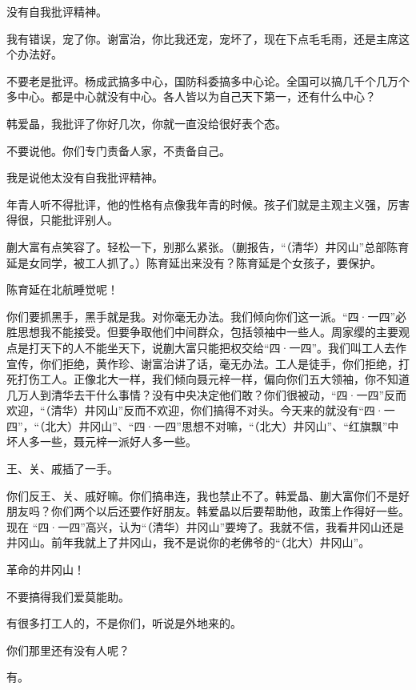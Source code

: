 没有自我批评精神。

我有错误，宠了你。谢富治，你比我还宠，宠坏了，现在下点毛毛雨，还是主席这个办法好。

不要老是批评。杨成武搞多中心，国防科委搞多中心论。全国可以搞几千个几万个多中心。都是中心就没有中心。各人皆以为自己天下第一，还有什么中心？

韩爱晶，我批评了你好几次，你就一直没给很好表个态。

不要说他。你们专门责备人家，不责备自己。

我是说他太没有自我批评精神。

年青人听不得批评，他的性格有点像我年青的时候。孩子们就是主观主义强，厉害得很，只能批评别人。

蒯大富有点笑容了。轻松一下，别那么紧张。（蒯报告，“（清华）井冈山”总部陈育延是女同学，被工人抓了。）陈育延出来没有？陈育延是个女孩子，要保护。

陈育延在北航睡觉呢！

你们要抓黑手，黑手就是我。对你毫无办法。我们倾向你们这一派。“四·一四”必胜思想我不能接受。但要争取他们中间群众，包括领袖中一些人。周家缨的主要观点是打天下的人不能坐天下，说蒯大富只能把权交给“四·一四”。我们叫工人去作宣传，你们拒绝，黄作珍、谢富治讲了话，毫无办法。工人是徒手，你们拒绝，打死打伤工人。正像北大一样，我们倾向聂元梓一样，偏向你们五大领袖，你不知道几万人到清华去干什么事情？没有中央决定他们敢？你们很被动，“四·一四”反而欢迎，“（清华）井冈山”反而不欢迎，你们搞得不对头。今天来的就没有“四·一四”，“（北大）井冈山”、“四·一四”思想不对嘛，“（北大）井冈山”、“红旗飘”中坏人多一些，聂元梓一派好人多一些。

王、关、戚插了一手。

你们反王、关、戚好嘛。你们搞串连，我也禁止不了。韩爱晶、蒯大富你们不是好朋友吗？你们两个以后还要作好朋友。韩爱晶以后要帮助他，政策上作得好一些。现在 “四·一四”高兴，认为“（清华）井冈山”要垮了。我就不信，我看井冈山还是井冈山。前年我就上了井冈山，我不是说你的老佛爷的“（北大）井冈山”。

革命的井冈山！

不要搞得我们爱莫能助。

有很多打工人的，不是你们，听说是外地来的。

你们那里还有没有人呢？

有。

